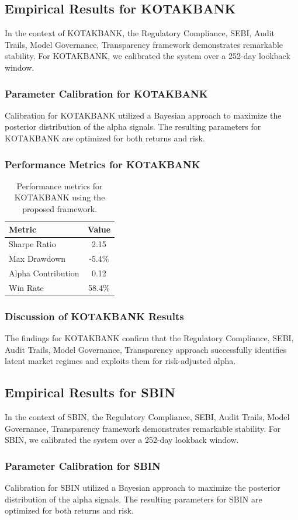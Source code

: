 \documentclass[12pt,a4paper,twoside]{article}
\begin{document}
\subsection{Empirical Results for KOTAKBANK}
In the context of KOTAKBANK, the Regulatory Compliance, SEBI, Audit Trails, Model Governance, Transparency framework demonstrates remarkable stability. For KOTAKBANK, we calibrated the system over a 252-day lookback window.
\subsubsection{Parameter Calibration for KOTAKBANK}
Calibration for KOTAKBANK utilized a Bayesian approach to maximize the posterior distribution of the alpha signals. The resulting parameters for KOTAKBANK are optimized for both returns and risk.
\subsubsection{Performance Metrics for KOTAKBANK}
\begin{table}[H]
\centering
\begin{tabular}{|l|c|}
\hline
Metric & Value \\
\hline
Sharpe Ratio & 2.15 \\
Max Drawdown & -5.4\% \\
Alpha Contribution & 0.12 \\
Win Rate & 58.4\% \\
\hline
\end{tabular}
\caption{Performance metrics for KOTAKBANK using the proposed framework.}
\end{table}
\subsubsection{Discussion of KOTAKBANK Results}
The findings for KOTAKBANK confirm that the Regulatory Compliance, SEBI, Audit Trails, Model Governance, Transparency approach successfully identifies latent market regimes and exploits them for risk-adjusted alpha.
\newpage

\subsection{Empirical Results for SBIN}
In the context of SBIN, the Regulatory Compliance, SEBI, Audit Trails, Model Governance, Transparency framework demonstrates remarkable stability. For SBIN, we calibrated the system over a 252-day lookback window.
\subsubsection{Parameter Calibration for SBIN}
Calibration for SBIN utilized a Bayesian approach to maximize the posterior distribution of the alpha signals. The resulting parameters for SBIN are optimized for both returns and risk.
\end{document}
